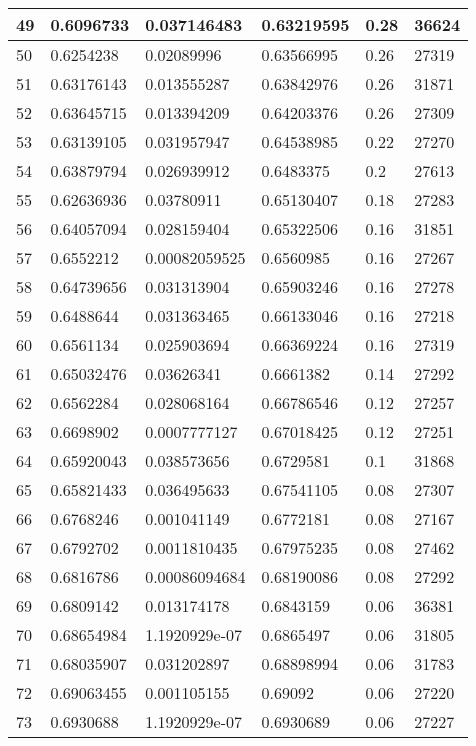 \begin{longtable}{|l|l|l|l|l|l|}
49 & 0.6096733 & 0.037146483 & 0.63219595 & 0.28 & 36624 \\ \hline 
50 & 0.6254238 & 0.02089996 & 0.63566995 & 0.26 & 27319 \\ \hline 
51 & 0.63176143 & 0.013555287 & 0.63842976 & 0.26 & 31871 \\ \hline 
52 & 0.63645715 & 0.013394209 & 0.64203376 & 0.26 & 27309 \\ \hline 
53 & 0.63139105 & 0.031957947 & 0.64538985 & 0.22 & 27270 \\ \hline 
54 & 0.63879794 & 0.026939912 & 0.6483375 & 0.2 & 27613 \\ \hline 
55 & 0.62636936 & 0.03780911 & 0.65130407 & 0.18 & 27283 \\ \hline 
56 & 0.64057094 & 0.028159404 & 0.65322506 & 0.16 & 31851 \\ \hline 
57 & 0.6552212 & 0.00082059525 & 0.6560985 & 0.16 & 27267 \\ \hline 
58 & 0.64739656 & 0.031313904 & 0.65903246 & 0.16 & 27278 \\ \hline 
59 & 0.6488644 & 0.031363465 & 0.66133046 & 0.16 & 27218 \\ \hline 
60 & 0.6561134 & 0.025903694 & 0.66369224 & 0.16 & 27319 \\ \hline 
61 & 0.65032476 & 0.03626341 & 0.6661382 & 0.14 & 27292 \\ \hline 
62 & 0.6562284 & 0.028068164 & 0.66786546 & 0.12 & 27257 \\ \hline 
63 & 0.6698902 & 0.0007777127 & 0.67018425 & 0.12 & 27251 \\ \hline 
64 & 0.65920043 & 0.038573656 & 0.6729581 & 0.1 & 31868 \\ \hline 
65 & 0.65821433 & 0.036495633 & 0.67541105 & 0.08 & 27307 \\ \hline 
66 & 0.6768246 & 0.001041149 & 0.6772181 & 0.08 & 27167 \\ \hline 
67 & 0.6792702 & 0.0011810435 & 0.67975235 & 0.08 & 27462 \\ \hline 
68 & 0.6816786 & 0.00086094684 & 0.68190086 & 0.08 & 27292 \\ \hline 
69 & 0.6809142 & 0.013174178 & 0.6843159 & 0.06 & 36381 \\ \hline 
70 & 0.68654984 & 1.1920929e-07 & 0.6865497 & 0.06 & 31805 \\ \hline 
71 & 0.68035907 & 0.031202897 & 0.68898994 & 0.06 & 31783 \\ \hline 
72 & 0.69063455 & 0.001105155 & 0.69092 & 0.06 & 27220 \\ \hline 
73 & 0.6930688 & 1.1920929e-07 & 0.6930689 & 0.06 & 27227 \\ \hline 

\end{longtable}
